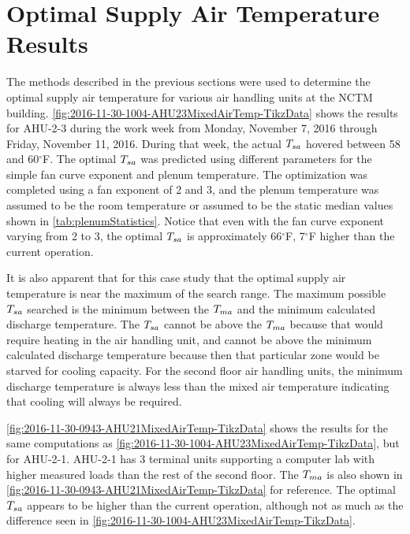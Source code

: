 \section{Optimal Supply Air Temperature Results}\label{sec:OptimalSupplyAirTemperatureResults}

The methods described in the previous sections were used to determine
the optimal supply air temperature for various air handling units at the
NCTM building.  \figref{}
\ref{fig:2016-11-30-1004-AHU23MixedAirTemp-TikzData} shows the results
for AHU-2-3 during the work week from Monday, November 7, 2016 through
Friday, November 11, 2016.  During that week, the actual \(T_{sa}\) hovered
between 58 and 60\(^\circ\)F. The optimal \(T_{sa}\) was predicted using
different parameters for the simple fan curve exponent and plenum
temperature.  The optimization was completed using a fan exponent of 2
and 3, and the plenum temperature was assumed to be the room temperature
or assumed to be the static median values shown in \tableref{}
\ref{tab:plenumStatistics}.  Notice that even with the fan curve
exponent varying from 2 to 3, the optimal \(T_{sa}\) is approximately
66\(^\circ\)F, 7\(^\circ\)F higher than the current operation. 

It is also apparent that for this case study that the optimal supply air
temperature is near the maximum of the search range.  The maximum
possible \(T_{sa}\) searched is the minimum between the \(T_{ma}\) and the
minimum calculated discharge temperature. The \(T_{sa}\) cannot be above
the \(T_{ma}\) because that would require heating in the air handling
unit, and cannot be above the minimum calculated discharge temperature
because then that particular zone would be starved for cooling capacity.
For the second floor air handling units, the minimum discharge
temperature is always less than the mixed air temperature indicating
that cooling will always be required.  

\figref{} \ref{fig:2016-11-30-0943-AHU21MixedAirTemp-TikzData} shows the
results for the same computations as \figref{}
\ref{fig:2016-11-30-1004-AHU23MixedAirTemp-TikzData}, but for AHU-2-1.
AHU-2-1 has 3 terminal units supporting a computer lab with higher
measured loads than the rest of the second floor.  The \(T_{ma}\) is also
shown in \figref{} \ref{fig:2016-11-30-0943-AHU21MixedAirTemp-TikzData}
for reference. The optimal \(T_{sa}\) appears to be higher than the
current operation, although not as much as the difference seen in
\figref{} \ref{fig:2016-11-30-1004-AHU23MixedAirTemp-TikzData}.


